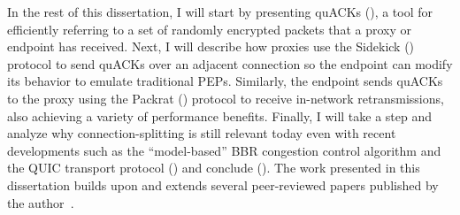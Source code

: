 In the rest of this dissertation, I will start by presenting quACKs
(), a tool for efficiently referring to a set of randomly
encrypted packets that a proxy or endpoint has received. Next, I will describe
how proxies use the Sidekick () protocol to send quACKs over
an adjacent connection so the endpoint can modify its behavior to emulate
traditional PEPs. Similarly, the endpoint sends quACKs to the proxy using the
Packrat () protocol to receive in-network retransmissions,
also achieving a variety of performance benefits. Finally, I will take a step
and analyze why connection-splitting is still relevant today even with recent
developments such as the ``model-based'' BBR congestion control algorithm and
the QUIC transport protocol () and conclude
().
The work presented in this dissertation builds upon and extends several
peer-reviewed papers published by the author~\cite{yuan2022sidecar,yuan2024sidekick,yuan2025internet}.






